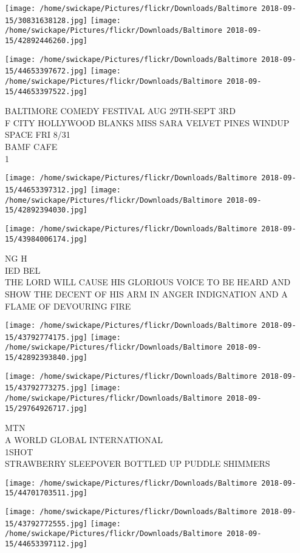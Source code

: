 \documentclass[10pt,letterpaper]{article}
\begin{document}
\texttt{[image: /home/swickape/Pictures/flickr/Downloads/Baltimore 2018-09-15/30831638128.jpg]}
\texttt{[image: /home/swickape/Pictures/flickr/Downloads/Baltimore 2018-09-15/42892446260.jpg]}

\texttt{[image: /home/swickape/Pictures/flickr/Downloads/Baltimore 2018-09-15/44653397672.jpg]}
\texttt{[image: /home/swickape/Pictures/flickr/Downloads/Baltimore 2018-09-15/44653397522.jpg]}

BALTIMORE COMEDY FESTIVAL AUG 29TH{-}SEPT 3RD\\
F CITY HOLLYWOOD BLANKS MISS SARA VELVET PINES WINDUP SPACE FRI 8/31\\
BAMF CAFE\\
1
\pagebreak

\texttt{[image: /home/swickape/Pictures/flickr/Downloads/Baltimore 2018-09-15/44653397312.jpg]}
\texttt{[image: /home/swickape/Pictures/flickr/Downloads/Baltimore 2018-09-15/42892394030.jpg]}

\vspace{0.25in}
\texttt{[image: /home/swickape/Pictures/flickr/Downloads/Baltimore 2018-09-15/43984006174.jpg]}

NG H\\
IED BEL\\
THE LORD WILL CAUSE HIS GLORIOUS VOICE TO BE HEARD AND SHOW THE DECENT OF HIS ARM IN ANGER INDIGNATION AND A FLAME OF DEVOURING FIRE
\pagebreak

\texttt{[image: /home/swickape/Pictures/flickr/Downloads/Baltimore 2018-09-15/43792774175.jpg]}
\texttt{[image: /home/swickape/Pictures/flickr/Downloads/Baltimore 2018-09-15/42892393840.jpg]}

\texttt{[image: /home/swickape/Pictures/flickr/Downloads/Baltimore 2018-09-15/43792773275.jpg]}
\texttt{[image: /home/swickape/Pictures/flickr/Downloads/Baltimore 2018-09-15/29764926717.jpg]}

MTN\\
A WORLD GLOBAL INTERNATIONAL\\
1SHOT\\
STRAWBERRY SLEEPOVER BOTTLED UP PUDDLE SHIMMERS
\pagebreak

\texttt{[image: /home/swickape/Pictures/flickr/Downloads/Baltimore 2018-09-15/44701703511.jpg]}

\vspace{0.25in}
\texttt{[image: /home/swickape/Pictures/flickr/Downloads/Baltimore 2018-09-15/43792772555.jpg]}
\texttt{[image: /home/swickape/Pictures/flickr/Downloads/Baltimore 2018-09-15/44653397112.jpg]}
\end{document}

